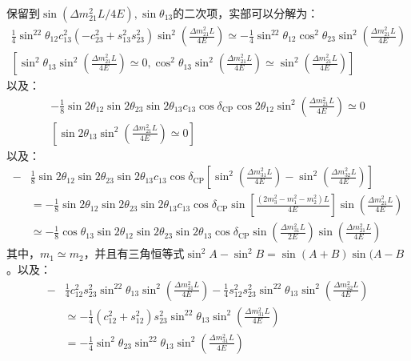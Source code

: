 \documentclass{article}
\begin{document}
	保留到$\sin(\Delta m_{21}^2L/4E),\sin\theta_{13}$的二次项，实部可以分解为：
	\begin{gather*}
		\frac{1}{4}\sin^22\theta_{12}c_{13}^2(-c_{23}^2+s_{13}^2s_{23}^2)\sin^2\left(\frac{\Delta m_{21}^2L}{4E}\right)
			\simeq-\frac{1}{4}\sin^22\theta_{12}\cos^2\theta_{23}\sin^2\left(\frac{\Delta m_{21}^2L}{4E}\right)\\
					\left[\sin^2\theta_{13}\sin^2\left(\frac{\Delta m_{21}^2L}{4E}\right)\simeq 0,\cos^2\theta_{13}\sin^2\left(\frac{\Delta m_{21}^2L}{4E}\right)\simeq\sin^2\left(\frac{\Delta m_{21}^2L}{4E}\right)\right]
	\end{gather*}
	以及：
	\begin{gather*}
		-\frac{1}{8}\sin2\theta_{12}\sin2\theta_{23}\sin2\theta_{13}c_{13}\cos\delta_{\mathrm{CP}}\cos2\theta_{12}\sin^2\left(\frac{\Delta m_{21}^2L}{4E}\right)\simeq 0\\
		\left[\sin2\theta_{13}\sin^2\left(\frac{\Delta m_{21}^2L}{4E}\right)\simeq0\right]
	\end{gather*}
	以及：
	\begin{equation*}
		\begin{aligned}
			-&\frac{1}{8}\sin2\theta_{12}\sin2\theta_{23}\sin2\theta_{13}c_{13}\cos\delta_\mathrm{CP}\left[\sin^2\left(\frac{\Delta m_{31}^2L}{4E}\right)-\sin^2\left(\frac{\Delta m_{32}^2L}{4E}\right)\right]\\
				&=-\frac{1}{8}\sin2\theta_{12}\sin2\theta_{23}\sin2\theta_{13}c_{13}\cos\delta_\mathrm{CP}\sin\left[\frac{(2m_3^2-m_1^2-m_2^2)L}{4E}\right]\sin\left(\frac{\Delta m_{21}^2L}{4E}\right)\\
					&\simeq-\frac{1}{8}\cos\theta_{13}\sin2\theta_{12}\sin2\theta_{23}\sin2\theta_{13}\cos\delta_\mathrm{CP}\sin\left(\frac{\Delta m_{31}^2L}{2E}\right)\sin\left(\frac{\Delta m_{21}^2L}{4E}\right)
		\end{aligned}
	\end{equation*}
	其中，$m_1\simeq m_2$，并且有三角恒等式$\sin^2A-\sin^2B=\sin(A+B)\sin(A-B$。以及：
	\begin{equation*}
		\begin{aligned}
			-&\frac{1}{4}c_{12}^2s_{23}^2\sin^22\theta_{13}\sin^2\left(\frac{\Delta m_{31}^2L}{4E}\right)-\frac{1}{4}s_{12}^2s_{23}^2\sin^22\theta_{13}\sin^2\left(\frac{\Delta m_{32}^2L}{4E}\right)\\
		&\simeq-\frac{1}{4}(c_{12}^2+s_{12}^2)s_{23}^2\sin^22\theta_{13}\sin^2\left(\frac{\Delta m_{31}^2L}{4E}\right)\\
		&=-\frac{1}{4}\sin^2\theta_{23}\sin^22\theta_{13}\sin^2\left(\frac{\Delta m_{31}^2L}{4E}\right)
		\end{aligned}
	\end{equation*}	
\end{document}
